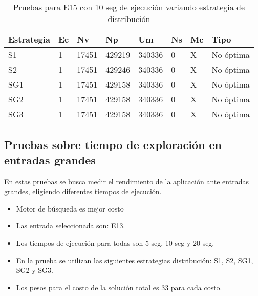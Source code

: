 \begin{center}
\begin{longtable}{|p{3cm}|p{1.0cm}|p{1.6cm}|p{1.6cm}|p{1.1cm}|p{1.1cm}|p{1.1cm}|p{2.7cm}|}
	\caption{Pruebas para E15 con 10 seg de ejecución variando estrategia de distribución} \\
	\hline
	\cellcolor[gray]{0.9} \textbf{Estrategia} & \cellcolor[gray]{0.9}\textbf{Ec} & \cellcolor[gray]{0.9}\textbf{Nv} & \cellcolor[gray]{0.9}\textbf{Np} & \cellcolor[gray]{0.9}\textbf{Um} & \cellcolor[gray]{0.9}\textbf{Ns} &  \cellcolor[gray]{0.9}\textbf{Mc} & \cellcolor[gray]{0.9}\textbf{Tipo}\\	\hline
	S1& 1 &17451  &429219 &340336  &0 &X&No óptima \\
	\hline
	S2& 1 &17451  &429246 &340336  &0 &X&No óptima \\
	\hline
	SG1& 1 &17451  &429158 &340336  &0 &X&No óptima \\
	\hline
	SG2& 1 &17451  &429158 &340336  &0 &X&No óptima \\
	\hline
	SG3& 1 &17451  &429158 &340336  &0 &X&No óptima \\
	\hline
\end{longtable}	
\end{center}
\subsection{Pruebas sobre tiempo de exploración en entradas grandes}

En estas pruebas se busca medir el rendimiento de la aplicación ante entradas grandes, eligiendo diferentes tiempos de ejecución.

\begin{itemize}
	\item Motor de búsqueda es mejor costo
	\item Las entrada seleccionada son: E13.	
	\item Los tiempos de ejecución para todas son 5 seg, 10 seg y 20 seg.
	\item En la prueba se utilizan las siguientes estrategias distribución: S1, S2, SG1, SG2 y SG3.
	\item Los pesos para el costo de la solución total es 33 para cada costo.
\end{itemize}

